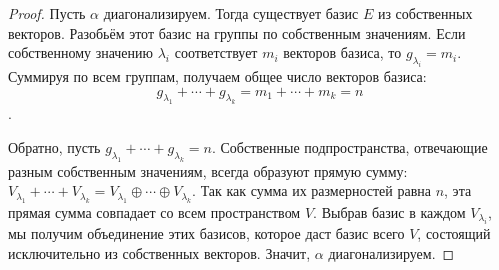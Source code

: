 \begin{proof}
	Пусть $\alpha$ диагонализируем. Тогда существует базис $E$ из собственных векторов. Разобьём этот базис на группы по собственным значениям. Если собственному значению $\lambda_i$ соответствует $m_i$ векторов базиса, то $g_{\lambda_i}=m_i$. Суммируя по всем группам, получаем общее число векторов базиса:
	\[
	g_{\lambda_1}+\cdots+g_{\lambda_k} = m_1+\cdots+m_k = n
	\].

	Обратно, пусть $g_{\lambda_1}+\cdots+g_{\lambda_k}=n$. Собственные подпространства, отвечающие разным собственным значениям, всегда образуют прямую сумму: $V_{\lambda_1}+\cdots+V_{\lambda_k} = V_{\lambda_1}\oplus\cdots\oplus V_{\lambda_k}$. Так как сумма их размерностей равна $n$, эта прямая сумма совпадает со всем пространством $V$. Выбрав базис в каждом $V_{\lambda_i}$, мы получим объединение этих базисов, которое даст базис всего $V$, состоящий исключительно из собственных векторов. Значит, $\alpha$ диагонализируем.
\end{proof}
